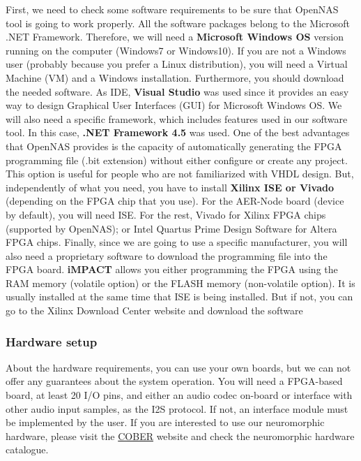 First, we need to check some software requirements to be sure that OpenNAS tool is going to work properly. All the software packages belong to the Microsoft .NET Framework. Therefore, we will need a \textbf{Microsoft Windows OS} version running on the computer (Windows7 or Windows10). If you are not a Windows user (probably because you prefer a Linux distribution), you will need a Virtual Machine (VM) and a Windows installation. Furthermore, you should download the needed software. As IDE, \textbf{Visual Studio} was used since it provides an easy way to design Graphical User Interfaces (GUI) for Microsoft Windows OS. We will also need a specific framework, which includes features used in our software tool. In this case, \textbf{.NET Framework 4.5} was used. One of the best advantages that OpenNAS provides is the capacity of automatically generating the FPGA programming file (.bit extension) without either configure or create any project. This option is useful for people who are not familiarized with VHDL design. But, independently of what you need, you have to install \textbf{Xilinx ISE or Vivado} (depending on the FPGA chip that you use). For the AER-Node board (device by default), you will need ISE. For the rest, Vivado for Xilinx FPGA chips (supported by OpenNAS); or Intel Quartus Prime Design Software for Altera FPGA chips. Finally, since we are going to use a specific manufacturer, you will also need a proprietary software to download the programming file into the FPGA board. \textbf{iMPACT} allows you either programming the FPGA using the RAM memory (volatile option) or the FLASH memory (non-volatile option). It is usually installed at the same time that ISE is being installed. But if not, you can go to the Xilinx Download Center website and download the software
    
\subsubsection{Hardware setup}

About the hardware requirements, you can use your own boards, but we can not offer any guarantees about the system operation. You will need a FPGA-based board, at least 20 I/O pins, and either an audio codec on-board or interface with other audio input samples, as the I2S protocol. If not, an interface module must be implemented by the user.
If you are interested to use our neuromorphic hardware, please visit the \textcolor{blue}{\href{https://www.t-cober.es}{COBER}} website and check the neuromorphic hardware catalogue.

